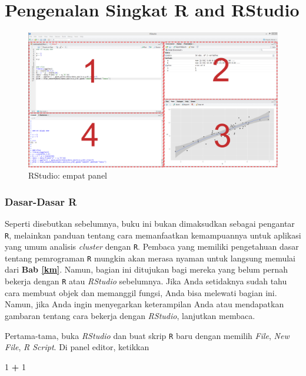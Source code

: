 \documentclass[
  oneside]{book}
\newenvironment{Shaded}{\begin{snugshade}}{\end{snugshade}}
\newcommand{\DecValTok}[1]{\textcolor[rgb]{0.00,0.00,0.81}{#1}}
\newcommand{\SpecialCharTok}[1]{\textcolor[rgb]{0.81,0.36,0.00}{\textbf{#1}}}
\begin{document}
\section{Pengenalan Singkat R and RStudio}\label{pengenalan-singkat-r-and-rstudio}

\begin{figure}[h]

{\centering \includegraphics[width=0.8\linewidth]{images/rstudio} 

}

\caption{RStudio: empat panel}\label{fig:unnamed-chunk-4}
\end{figure}

\subsubsection*{Dasar-Dasar R}\label{dasar-dasar-r}

Seperti disebutkan sebelumnya, buku ini bukan dimaksudkan sebagai pengantar \texttt{R}, melainkan panduan tentang cara memanfaatkan kemampuannya untuk aplikasi yang umum analisis \emph{cluster} dengan \texttt{R}. Pembaca yang memiliki pengetahuan dasar tentang pemrograman \texttt{R} mungkin akan merasa nyaman untuk langsung memulai dari \textbf{Bab \ref{km}}. Namun, bagian ini ditujukan bagi mereka yang belum pernah bekerja dengan \texttt{R} atau \emph{RStudio} sebelumnya. Jika Anda setidaknya sudah tahu cara membuat objek dan memanggil fungsi, Anda bisa melewati bagian ini. Namun, jika Anda ingin menyegarkan keterampilan Anda atau mendapatkan gambaran tentang cara bekerja dengan \emph{RStudio}, lanjutkan membaca.

Pertama-tama, buka \emph{RStudio} dan buat skrip \texttt{R} baru dengan memilih \emph{File}, \emph{New File}, \emph{R Script}. Di panel editor, ketikkan

\begin{Shaded}
\begin{Highlighting}[]
\DecValTok{1} \SpecialCharTok{+} \DecValTok{1}
\end{Highlighting}
\end{Shaded}
\end{document}

